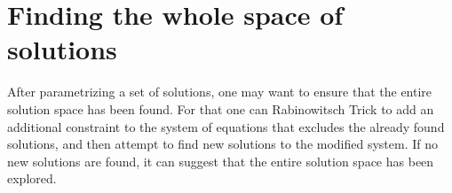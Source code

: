 \section*{Finding the whole space of solutions}
After parametrizing a set of solutions, one may want to ensure that the entire solution space has been found. For that one can Rabinowitsch Trick to add an additional constraint to the system of equations that excludes the already found solutions, and then attempt to find new solutions to the modified system. If no new solutions are found, it can suggest that the entire solution space has been explored.


